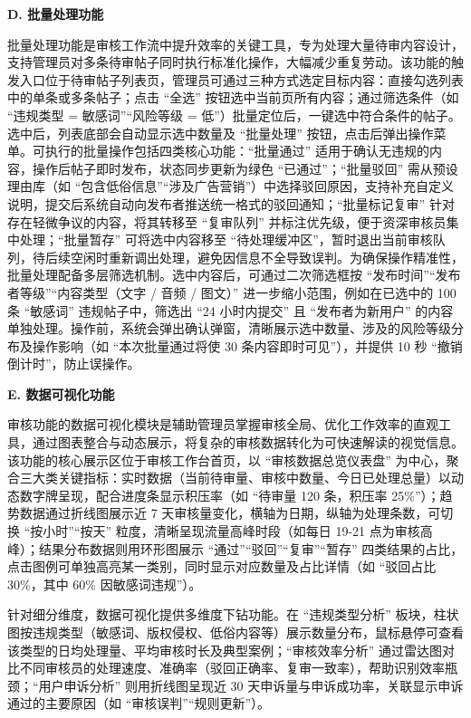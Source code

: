 \documentclass{base}
\numberwithin{figure}{section} %
\begin{document}
\textbf{D. 批量处理功能}

批量处理功能是审核工作流中提升效率的关键工具，专为处理大量待审内容设计，支持管理员对多条待审帖子同时执行标准化操作，大幅减少重复劳动。​
该功能的触发入口位于待审帖子列表页，管理员可通过三种方式选定目标内容：直接勾选列表中的单条或多条帖子；点击 “全选” 按钮选中当前页所有内容；通过筛选条件（如 “违规类型 = 敏感词”“风险等级 = 低”）批量定位后，一键选中符合条件的帖子。选中后，列表底部会自动显示选中数量及 “批量处理” 按钮，点击后弹出操作菜单。​
可执行的批量操作包括四类核心功能：“批量通过” 适用于确认无违规的内容，操作后帖子即时发布，状态同步更新为绿色 “已通过”；“批量驳回” 需从预设理由库（如 “包含低俗信息”“涉及广告营销”）中选择驳回原因，支持补充自定义说明，提交后系统自动向发布者推送统一格式的驳回通知；“批量标记复审” 针对存在轻微争议的内容，将其转移至 “复审队列” 并标注优先级，便于资深审核员集中处理；“批量暂存” 可将选中内容移至 “待处理缓冲区”，暂时退出当前审核队列，待后续空闲时重新调出处理，避免因信息不全导致误判。​
为确保操作精准性，批量处理配备多层筛选机制。选中内容后，可通过二次筛选框按 “发布时间”“发布者等级”“内容类型（文字 / 音频 / 图文）” 进一步缩小范围，例如在已选中的 100 条 “敏感词” 违规帖子中，筛选出 “24 小时内提交” 且 “发布者为新用户” 的内容单独处理。操作前，系统会弹出确认弹窗，清晰展示选中数量、涉及的风险等级分布及操作影响（如 “本次批量通过将使 30 条内容即时可见”），并提供 10 秒 “撤销倒计时”，防止误操作。​


\textbf{E. 数据可视化功能}

审核功能的数据可视化模块是辅助管理员掌握审核全局、优化工作效率的直观工具，通过图表整合与动态展示，将复杂的审核数据转化为可快速解读的视觉信息。​
该功能的核心展示区位于审核工作台首页，以 “审核数据总览仪表盘” 为中心，聚合三大类关键指标：实时数据（当前待审量、审核中数量、今日已处理总量）以动态数字牌呈现，配合进度条显示积压率（如 “待审量 120 条，积压率 25\%”）；趋势数据通过折线图展示近 7 天审核量变化，横轴为日期，纵轴为处理条数，可切换 “按小时”“按天” 粒度，清晰呈现流量高峰时段（如每日 19-21 点为审核高峰）；结果分布数据则用环形图展示 “通过”“驳回”“复审”“暂存” 四类结果的占比，点击图例可单独高亮某一类别，同时显示对应数量及占比详情（如 “驳回占比 30\%，其中 60\% 因敏感词违规”）。​

针对细分维度，数据可视化提供多维度下钻功能。在 “违规类型分析” 板块，柱状图按违规类型（敏感词、版权侵权、低俗内容等）展示数量分布，鼠标悬停可查看该类型的日均处理量、平均审核时长及典型案例；“审核效率分析” 通过雷达图对比不同审核员的处理速度、准确率（驳回正确率、复审一致率），帮助识别效率瓶颈；“用户申诉分析” 则用折线图呈现近 30 天申诉量与申诉成功率，关联显示申诉通过的主要原因（如 “审核误判”“规则更新”）。​
\end{document}
